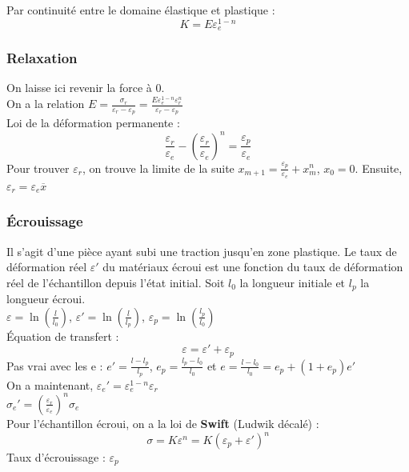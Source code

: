 \documentclass[../main.tex]{subfiles}
\begin{document}
Par continuité entre le domaine élastique et plastique :\\
\begin{equation}
    K = E\varepsilon_e^{1-n}
\end{equation}

\subsubsection{Relaxation}
On laisse ici revenir la force à 0. \\
On a la relation $E = \frac{\sigma_r}{\varepsilon_r-\varepsilon_p} = \frac{E \varepsilon_e^{1-n}\varepsilon_r^n}{\varepsilon_r-\varepsilon_p}$\\
Loi de la déformation permanente : \\
\begin{equation}
    \frac{\varepsilon_r}{\varepsilon_e} - (\frac{\varepsilon_r}{\varepsilon_e})^n = \frac{\varepsilon_p}{\varepsilon_e}
\end{equation}
Pour trouver $\varepsilon_r$, on trouve la limite de la suite $x_{m+1} = \frac{\varepsilon_p}{\varepsilon_e}+x_m^n$, $x_0 = 0$. Ensuite, $\varepsilon_r = \varepsilon_e \overline{x}$\\

\subsubsection{Écrouissage}
Il s'agit d'une pièce ayant subi une traction jusqu'en zone plastique. Le taux de déformation réel $\varepsilon'$ du matériaux écroui est une fonction du taux de déformation réel de l'échantillon depuis l'état initial. Soit $l_0$ la longueur initiale et $l_p$ la longueur écroui. \\
$\varepsilon = \ln(\frac{l}{l_0})$, $\varepsilon' = \ln(\frac{l}{l_p})$, $\varepsilon_p = \ln(\frac{l_p}{l_0})$\\
Équation de transfert :\\
\begin{equation}
    \varepsilon = \varepsilon'+\varepsilon_p
\end{equation}
\warning Pas vrai avec les e : $e' = \frac{l-l_p}{l_p}$, $e_p = \frac{l_p-l_0}{l_0}$ et $e = \frac{l-l_0}{l_0} = e_p + (1+e_p)e'$\\

On a maintenant, $\varepsilon_e' = \varepsilon_e^{1-n} \varepsilon_r$\\
$\sigma_e' = (\frac{\varepsilon_r}{\varepsilon_e})^n\sigma_e$\\
Pour l'échantillon écroui, on a la loi de \textbf{Swift} (Ludwik décalé) :\\
\begin{equation}
    \sigma = K\varepsilon^n = K(\varepsilon_p + \varepsilon')^n
\end{equation}
Taux d'écrouissage : $\varepsilon_p$\\
\end{document}

